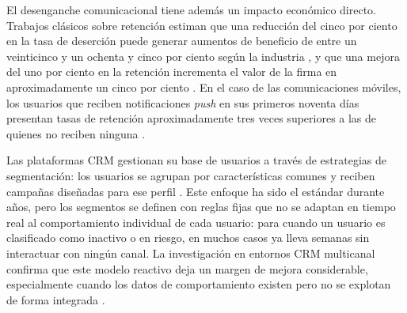 \documentclass[11pt,a4paper]{article}
\begin{document}
El desenganche comunicacional tiene además un impacto económico directo.
Trabajos clásicos sobre retención estiman que una reducción del cinco
por ciento en la tasa de deserción puede generar aumentos de beneficio
de entre un veinticinco y un ochenta y cinco por ciento según la
industria \cite{reichheld1990zero}, y que una mejora del uno por ciento
en la retención incrementa el valor de la firma en aproximadamente un
cinco por ciento \cite{gupta2004valuing}. En el caso de las
comunicaciones móviles, los usuarios que reciben notificaciones
\textit{push} en sus primeros noventa días presentan tasas de retención
aproximadamente tres veces superiores a las de quienes no reciben
ninguna \cite{airship2018push}.

Las plataformas CRM gestionan su base de usuarios a través de estrategias
de segmentación: los usuarios se agrupan por características comunes y
reciben campañas diseñadas para ese perfil
\cite{alvesgomes2023review,verhoef2010crm}. Este enfoque ha sido el
estándar durante años, pero los segmentos se definen con reglas fijas que
no se adaptan en tiempo real al comportamiento individual de cada usuario:
para cuando un usuario es clasificado como inactivo o en riesgo, en muchos
casos ya lleva semanas sin interactuar con ningún canal. La investigación
en entornos CRM multicanal confirma que este modelo reactivo deja un
margen de mejora considerable, especialmente cuando los datos de
comportamiento existen pero no se explotan de forma integrada
\cite{alvesgomes2023review,verhoef2010crm,abdelhady2025leveraging}.
\end{document}

